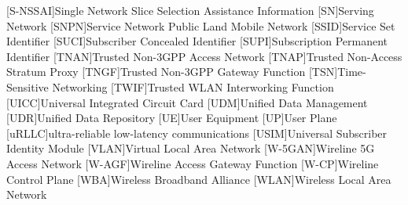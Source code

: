 \begin{multicols}{2}
\begin{acronym}[AAAAAA]
        [S-NSSAI]{Single Network Slice Selection Assistance Information}
        [SN]{Serving Network}
        [SNPN]{Service Network Public Land Mobile Network}
        [SSID]{Service Set Identifier}
        [SUCI]{Subscriber Concealed Identifier}
        [SUPI]{Subscription Permanent Identifier}
        [TNAN]{Trusted Non-3GPP Access Network}
        [TNAP]{Trusted Non-Access Stratum Proxy}
        [TNGF]{Trusted Non-3GPP Gateway Function}
        [TSN]{Time-Sensitive Networking}
        [TWIF]{Trusted WLAN Interworking Function}
        [UICC]{Universal Integrated Circuit Card}
        [UDM]{Unified Data Management}
        [UDR]{Unified Data Repository}
        [UE]{User Equipment}
        [UP]{User Plane}
        [uRLLC]{ultra-reliable low-latency communications}
        [USIM]{Universal Subscriber Identity Module}
        [VLAN]{Virtual Local Area Network}
        [W-5GAN]{Wireline 5G Access Network}
        [W-AGF]{Wireline Access Gateway Function}
        [W-CP]{Wireline Control Plane}
        [WBA]{Wireless Broadband Alliance}
        [WLAN]{Wireless Local Area Network}
    \end{acronym}
\end{multicols}